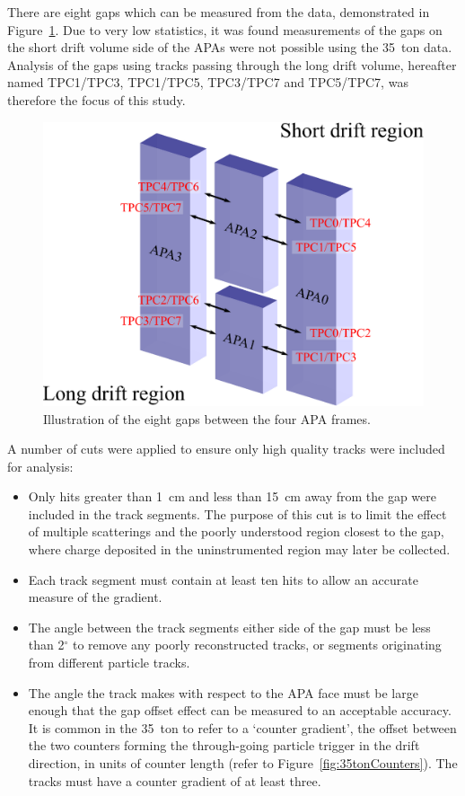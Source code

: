 There are eight gaps which can be measured from the data, demonstrated in Figure~\ref{fig:APAGapCrossingGaps}.  Due to very low statistics, it was found measurements of the gaps on the short drift volume side of the APAs were not possible using the 35~ton data.  Analysis of the gaps using tracks passing through the long drift volume, hereafter named TPC1/TPC3, TPC1/TPC5, TPC3/TPC7 and TPC5/TPC7, was therefore the focus of this study.

\begin{figure}
  \centering
  \includegraphics[width=12cm]{APAGapCrossingGaps.eps}
  \caption{Illustration of the eight gaps between the four APA frames.}
  \label{fig:APAGapCrossingGaps}
\end{figure}

A number of cuts were applied to ensure only high quality tracks were included for analysis:
\begin{itemize}
  \item{Only hits greater than 1~cm and less than 15~cm away from the gap were included in the track segments.  The purpose of this cut is to limit the effect of multiple scatterings and the poorly understood region closest to the gap, where charge deposited in the uninstrumented region may later be collected.}
  \item{Each track segment must contain at least ten hits to allow an accurate measure of the gradient.}
  \item{The angle between the track segments either side of the gap must be less than 2$^\circ$ to remove any poorly reconstructed tracks, or segments originating from different particle tracks.}
  \item{The angle the track makes with respect to the APA face must be large enough that the gap offset effect can be measured to an acceptable accuracy.  It is common in the 35~ton to refer to a `counter gradient', the offset between the two counters forming the through-going particle trigger in the drift direction, in units of counter length (refer to Figure~\ref{fig:35tonCounters}).  The tracks must have a counter gradient of at least three.}
\end{itemize}

